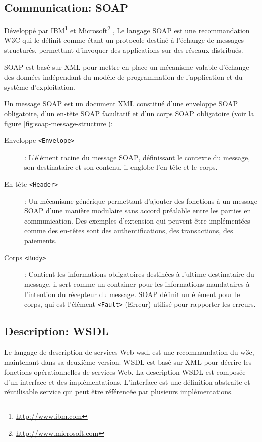   \subsection{Communication: SOAP}
  \label{sec:soap}
  Développé par IBM\footnote{\url{http://www.ibm.com}} et
  Microsoft\footnote{\url{http://www.microsoft.com}}
  \cite{box2000simple}, Le langage \textsc{SOAP} est une
  recommandation \textsc{W3C} \cite{mitra2003soap} qui le définit
  comme étant un protocole destiné à l'échange de messages structurés,
  permettant d'invoquer des applications sur des réseaux distribués.

  \textsc{SOAP} est basé sur \textsc{XML} pour mettre en place un
  mécanisme valable d'échange des données indépendant du modèle de
  programmation de l'application et du système d'exploitation.

  Un message \textsc{SOAP} est un document XML constitué d'une
  enveloppe \textsc{SOAP} obligatoire, d'un en-tête \textsc{SOAP}
  facultatif et d'un corps \textsc{SOAP} obligatoire (voir la figure
  \ref{fig:soap-message-structure}):

  

  \renewcommand{\descriptionlabel}[1]{\hspace{1cm}\textbullet~\textsf{#1}}
  \begin{description}
  \item[Enveloppe \texttt{<Envelope>}]: L'élément racine du message
    \textsc{SOAP}, définissant le contexte du message, son
    destinataire et son contenu, il englobe l'en-tête et le corps.

  \item[En-tête \texttt{<Header>}]: Un mécanisme générique permettant
    d'ajouter des fonctions à un message \textsc{SOAP} d'une manière
    modulaire sans accord préalable entre les parties en
    communication.  Des exemples d'extension qui peuvent être
    implémentées comme des en-têtes sont des authentifications, des
    transactions, des paiements.
\newpage
  \item[Corps \texttt{<Body>}]: Contient les informations obligatoires
    destinées à l'ultime destinataire du message, il sert comme un
    container pour les informations mandataires à l'intention du
    récepteur du message. \textsc{SOAP} définit un élément pour le
    corps, qui est l'élément \texttt{<Fault>} (Erreur) utilisé pour
    rapporter les erreurs.
  \end{description}

  \subsection{Description: WSDL}
  \label{sec:wsdl}
  Le langage de description de services Web \acrshort{wsdl}
  \cite{christensen2001web, chinnici2007web} est une recommandation du
  \acrshort{w3c}, maintenant dans sa deuxième version.  \textsc{WSDL}
  est basé sur \textsc{XML} pour décrire les fonctions opérationnelles
  de services Web. La description \textsc{WSDL} est composée d'un
  interface et des implémentations. L'interface est une définition
  abstraite et réutilisable service qui peut être référencée par
  plusieurs implémentations.

